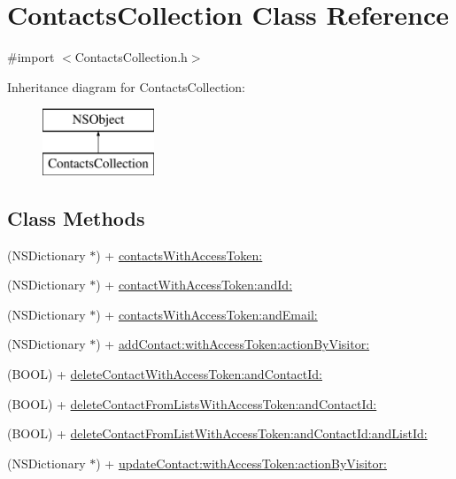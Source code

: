 \hypertarget{interface_contacts_collection}{\section{Contacts\-Collection Class Reference}
\label{interface_contacts_collection}
}


{\ttfamily \#import $<$Contacts\-Collection.\-h$>$}

Inheritance diagram for Contacts\-Collection\-:\begin{figure}[H]
\begin{center}
\leavevmode
\includegraphics[height=2.000000cm]{interface_contacts_collection}
\end{center}
\end{figure}
\subsection*{Class Methods}
\begin{DoxyCompactItemize}
\item 
(N\-S\-Dictionary $\ast$) + \hyperlink{interface_contacts_collection_a30f6142c5cbab3b9b31b164d37b8af02}{contacts\-With\-Access\-Token\-:}
\item 
(N\-S\-Dictionary $\ast$) + \hyperlink{interface_contacts_collection_a264e1670ea3126d92e80644f85ecd176}{contact\-With\-Access\-Token\-:and\-Id\-:}
\item 
(N\-S\-Dictionary $\ast$) + \hyperlink{interface_contacts_collection_a6d3c05c35c1b7333880c2ddbbe78b82c}{contacts\-With\-Access\-Token\-:and\-Email\-:}
\item 
(N\-S\-Dictionary $\ast$) + \hyperlink{interface_contacts_collection_a74d2efb3feb7bc7576ca32abb3aa7ce9}{add\-Contact\-:with\-Access\-Token\-:action\-By\-Visitor\-:}
\item 
(B\-O\-O\-L) + \hyperlink{interface_contacts_collection_a0a9e3924034dd059a7d6697f826aa974}{delete\-Contact\-With\-Access\-Token\-:and\-Contact\-Id\-:}
\item 
(B\-O\-O\-L) + \hyperlink{interface_contacts_collection_af8199d98c27b451dddf6141900c468ab}{delete\-Contact\-From\-Lists\-With\-Access\-Token\-:and\-Contact\-Id\-:}
\item 
(B\-O\-O\-L) + \hyperlink{interface_contacts_collection_a38a710134be4cdb3d34d1f619a626d30}{delete\-Contact\-From\-List\-With\-Access\-Token\-:and\-Contact\-Id\-:and\-List\-Id\-:}
\item 
(N\-S\-Dictionary $\ast$) + \hyperlink{interface_contacts_collection_a4e61d6013999c298b76ea10fc128caf6}{update\-Contact\-:with\-Access\-Token\-:action\-By\-Visitor\-:}
\end{DoxyCompactItemize}


